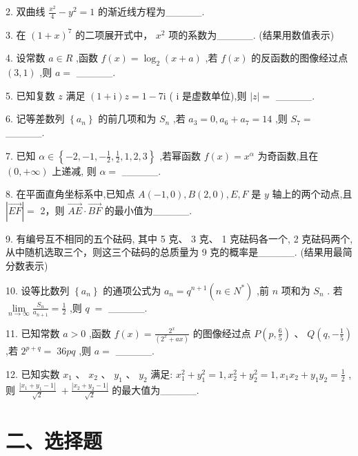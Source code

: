 \documentclass[10pt]{article}
\begin{document}
2. 双曲线 \(\frac{{x}^{2}}{4} - {y}^{2} = 1\) 的渐近线方程为\_\_\_\_\_.

3. 在 \({\left( 1 + x\right) }^{7}\) 的二项展开式中， \({x}^{2}\) 项的系数为\_\_\_\_\_. (结果用数值表示)

4. 设常数 \(a \in  R\) ,函数 \(f\left( x\right)  = {\log }_{2}\left( {x + a}\right)\) ,若 \(f\left( x\right)\) 的反函数的图像经过点 \(\left( {3,1}\right)\) ,则 \(a =\) \_\_\_\_\_.

5. 已知复数 \(z\) 满足 \(\left( {1 + \mathrm{i}}\right) z = 1 - 7\mathrm{i}\) ( \(\mathrm{i}\) 是虚数单位),则 \(\left| z\right|  =\) \_\_\_\_\_.

6. 记等差数列 \(\left\{  {a}_{n}\right\}\) 的前几项和为 \({S}_{n}\) ,若 \({a}_{3} = 0,{a}_{6} + {a}_{7} = {14}\) ,则 \({S}_{7} =\) \_\_\_\_\_.

7. 已知 \(\alpha  \in  \left\{  {-2, - 1, - \frac{1}{2},\frac{1}{2},1,2,3}\right\}\) ,若幂函数 \(f\left( x\right)  = {x}^{\alpha }\) 为奇函数,且在 \(\left( {0, + \infty }\right)\) 上递减, 则 \(\alpha  =\) \_\_\_\_\_.

8. 在平面直角坐标系中,已知点 \(A\left( {-1,0}\right) ,B\left( {2,0}\right) ,E,F\) 是 \(y\) 轴上的两个动点,且 \(\left| \overrightarrow{EF}\right|  =\) 2，则 \(\overrightarrow{AE} \cdot  \overrightarrow{BF}\) 的最小值为\_\_\_\_\_.

9. 有编号互不相同的五个砝码, 其中 5 克、 3 克、 1 克砝码各一个, 2 克砝码两个, 从中随机选取三个，则这三个砝码的总质量为 9 克的概率是\_\_\_\_\_. (结果用最简分数表示)

10. 设等比数列 \(\left\{  {a}_{n}\right\}\) 的通项公式为 \({a}_{n} = {q}^{n + 1}\left( {n \in  {N}^{ * }}\right)\) ,前 \(n\) 项和为 \({S}_{n}\) . 若 \(\mathop{\lim }\limits_{{n \rightarrow  \infty }}\frac{{S}_{n}}{{a}_{n + 1}} = \frac{1}{2}\) ,则 \(q \; =\) \_\_\_\_\_.

11. 已知常数 \(a > 0\) ,函数 \(f\left( x\right)  = \frac{{2}^{x}}{\left( {2}^{x} + ax\right) }\) 的图像经过点 \(P\left( {p,\frac{6}{5}}\right) \text{ 、 }Q\left( {q, - \frac{1}{5}}\right)\) ,若 \({2}^{p + q} = \; {36pq}\) ,则 \(a =\) \_\_\_\_\_.

12. 已知实数 \({x}_{1}\text{ 、 }{x}_{2}\text{ 、 }{y}_{1}\text{ 、 }{y}_{2}\) 满足: \({x}_{1}^{2} + {y}_{1}^{2} = 1,{x}_{2}^{2} + {y}_{2}^{2} = 1,{x}_{1}{x}_{2} + {y}_{1}{y}_{2} = \frac{1}{2}\) ,则 \(\frac{\left| {x}_{1} + {y}_{1} - 1\right| }{\sqrt{2}} \; + \frac{\left| {x}_{2} + {y}_{2} - 1\right| }{\sqrt{2}}\) 的最大值为\_\_\_\_\_.

\section*{二、选择题}
\end{document}
